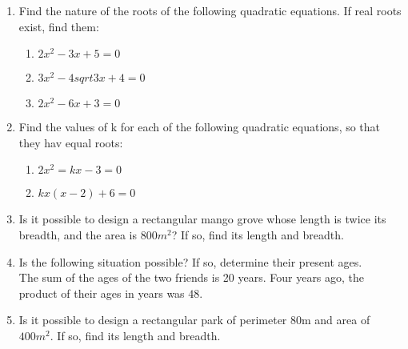 \begin{enumerate}
\item Find the nature of the roots of the following quadratic equations. If real roots exist, find them:
\begin{enumerate}[label=(\roman*)]
\item $2x^2-3x+5=0$
\item $3x^2-4 sqrt 3x+4=0$
\item $2x^2-6x+3=0$
\end{enumerate}
\item Find the values of k for each of the following quadratic equations, so that they hav equal roots:
\begin{enumerate}[label=(\roman*)]
\item $2x^2=kx-3=0$
\item $kx(x-2)+6=0$
\end{enumerate}
\item Is it possible to design a rectangular mango grove whose length is twice its breadth, and the area is  $800m^2$? If so, find its length and breadth.
\item Is the following situation possible? If so, determine their present ages.
\\ The sum of the ages of the two friends is 20 years. Four years ago, the product of their ages in years was $48$.
\item Is it possible to design a rectangular park of perimeter 80m and area of $400m^2$. If so, find its length and breadth.
\end{enumerate}

